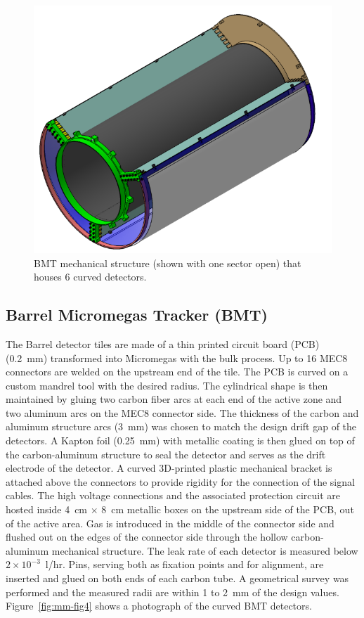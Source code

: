 \begin{figure}[htb]
 \includegraphics[width=1.0\columnwidth,keepaspectratio]{images/fig3}
 \caption{BMT mechanical structure (shown with one sector open) that houses 6 curved detectors.}
 \label{fig:mm-fig3}
\end{figure}

\subsection{Barrel Micromegas Tracker (BMT)}

The Barrel detector tiles are made of a thin printed circuit board (PCB) (0.2~mm) transformed into Micromegas with the
bulk process. Up to 16 MEC8 connectors are welded on the upstream end of the tile. The PCB is curved on a custom mandrel
tool with the desired radius. The cylindrical shape is then maintained by gluing two carbon fiber arcs at each end of the
active zone and two aluminum arcs on the MEC8 connector side. The thickness of the carbon and aluminum structure arcs
(3~mm) was chosen to match the design drift gap of the detectors. A Kapton foil (0.25~mm) with metallic coating is then
glued on top of the carbon-aluminum structure to seal the detector and serves as the drift electrode of the detector. A
curved 3D-printed plastic mechanical bracket is attached above the connectors to provide rigidity for the connection of
the signal cables. The high voltage connections and the associated protection circuit are hosted inside 4~cm $\times$ 8~cm
metallic boxes on the upstream side of the PCB, out of the active area.  Gas is introduced in the middle of the connector
side and flushed out on the edges of the connector side through the hollow carbon-aluminum mechanical structure. The
leak rate of each detector is measured below \(2\times10^{-3}\)~l/hr. Pins, serving both as fixation points and for
alignment, are inserted and glued on both ends of each carbon tube. A geometrical survey was performed and the
measured radii are within 1 to 2~mm of the design values. Figure~\ref{fig:mm-fig4} shows a photograph of the curved BMT
detectors.

